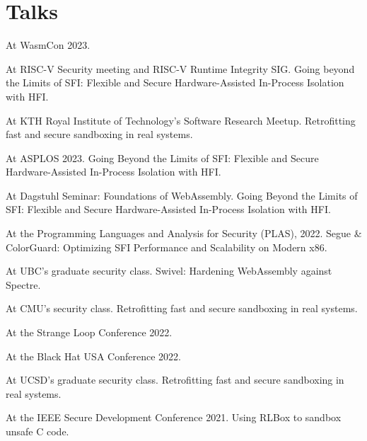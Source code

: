 \section{Talks}

{ At WasmCon 2023. }

{ At RISC-V Security meeting and RISC-V Runtime Integrity SIG. Going beyond the
Limits of SFI: Flexible and Secure Hardware-Assisted In-Process Isolation with
HFI. }

{ At KTH Royal Institute of Technology's Software Research Meetup.
Retrofitting fast and secure sandboxing in real systems.
}

{ At ASPLOS 2023. Going Beyond the Limits of SFI: Flexible and Secure
Hardware-Assisted In-Process Isolation with HFI. }

{ At Dagstuhl Seminar:
{Foundations of WebAssembly}. Going Beyond the Limits of SFI: Flexible and
Secure Hardware-Assisted In-Process Isolation with HFI. }

{ At the Programming Languages and Analysis for Security (PLAS), 2022. Segue \&
ColorGuard: Optimizing SFI Performance and Scalability on Modern x86. }

{ At UBC's graduate security class. Swivel: Hardening WebAssembly against
Spectre. }

{ At CMU's security class. Retrofitting fast and secure sandboxing in real
systems. }

{ At the Strange Loop Conference 2022.
}

{ At the Black Hat USA Conference 2022.
}

{ At UCSD's graduate security class. Retrofitting fast and secure sandboxing in
real systems. }

{ At the IEEE Secure Development Conference 2021. Using RLBox to sandbox unsafe C
code. }


